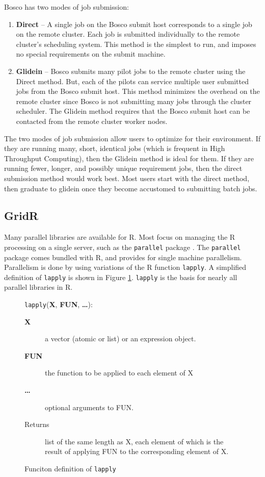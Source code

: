 \documentclass[conference]{IEEEtran}
\begin{document}
Bosco has two modes of job submission:
\begin{enumerate}
\item \textbf{Direct} -- A single job on the Bosco submit host corresponds to a single job on the remote cluster.  Each job is submitted individually to the remote cluster's scheduling system.  This method is the simplest to run, and imposes no special requirements on the submit machine.
\item \textbf{Glidein} -- Bosco submits many pilot jobs to the remote cluster using the Direct method.  But, each of the pilots can service multiple user submitted jobs from the Bosco submit host.  This method minimizes the overhead on the remote cluster since Bosco is not submitting many jobs through the cluster scheduler.  The Glidein method requires that the Bosco submit host can be contacted from the remote cluster worker nodes. \label{sec:glidein}
\end{enumerate}

The two modes of job submission allow users to optimize for their environment.  If they are running many, short, identical jobs (which is frequent in High Throughput Computing), then the Glidein method is ideal for them.  If they are running fewer, longer, and possibly unique requirement jobs, then the direct submission method would work best.  Most users start with the direct method, then graduate to glidein once they become accustomed to submitting batch jobs.

\subsection{GridR}
Many parallel libraries are available for R.  Most focus on managing the R processing on a single server, such as the \texttt{parallel} package \cite{rparallelpackage}.  The \texttt{parallel} package comes bundled with R, and provides for single machine parallelism.  Parallelism is done by using variations of the R function \texttt{lapply}.  A simplified definition of \texttt{lapply} is shown in Figure \ref{lst:lapply}.  \texttt{lapply} is the basis for nearly all parallel libraries in R.  

\begin{figure}[ht!]
\begin{framed}
\texttt{lapply}(\textbf{X}, \textbf{FUN}, \textbf{\ldots}):
\begin{description}
\item[\textbf{X}] a vector (atomic or list) or an expression object.
\item[\textbf{FUN}] the function to be applied to each element of X
\item[\textbf{\ldots}] optional arguments to FUN.
\item[Returns] list of the same length as X, each element of which is the result of applying FUN to the corresponding element of X.
\end{description}
\end{framed}

\centering
\captionsetup{justification=centering}
\caption{Funciton definition of \texttt{lapply}}
\label{lst:lapply}
\end{figure}
\end{document}
